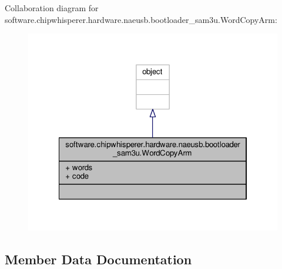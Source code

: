 Collaboration diagram for software.\+chipwhisperer.\+hardware.\+naeusb.\+bootloader\+\_\+sam3u.\+Word\+Copy\+Arm\+:\nopagebreak
\begin{figure}[H]
\begin{center}
\leavevmode
\includegraphics[width=322pt]{df/d64/classsoftware_1_1chipwhisperer_1_1hardware_1_1naeusb_1_1bootloader__sam3u_1_1WordCopyArm__coll__graph}
\end{center}
\end{figure}


\subsection{Member Data Documentation}
\hypertarget{classsoftware_1_1chipwhisperer_1_1hardware_1_1naeusb_1_1bootloader__sam3u_1_1WordCopyArm_a8b1b16bf9a66da7029d763029e4b88db}{}
